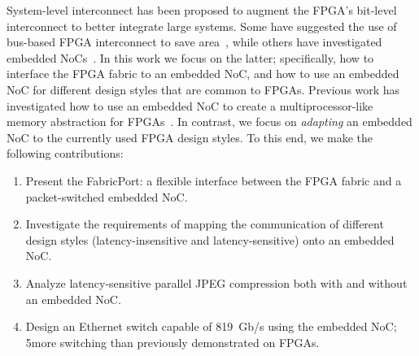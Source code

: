 %
%

System-level interconnect has been proposed to augment the FPGA's bit-level interconnect to better integrate large systems.
Some have suggested the use of bus-based FPGA interconnect to save area~\cite{Ye2006}, while others have investigated embedded NoCs~\cite{micro, Francis2008, Goossens2008}.
In this work we focus on the latter; specifically, how to interface the FPGA fabric to an embedded NoC, and how to use an embedded NoC for different design styles that are common to FPGAs.
Previous work has investigated how to use an embedded NoC to create a multiprocessor-like memory abstraction for FPGAs~\cite{Chung2011}.
In contrast, we focus on \textit{adapting} an embedded NoC to the currently used FPGA design styles.
To this end, we make the following contributions:
%
\vspace{-0.1cm}
%
\begin{enumerate}
\setlength\itemsep{-0.33mm}
\item Present the FabricPort: a flexible interface between the FPGA fabric and a packet-switched embedded NoC.
\item Investigate the requirements of mapping the communication of different design styles (latency-insensitive and latency-sensitive) onto an embedded NoC.
\item Analyze latency-sensitive parallel JPEG compression both with and without an embedded NoC.
\item Design an Ethernet switch capable of 819~Gb/s using the embedded NoC; 5\xx more switching than previously demonstrated on FPGAs.
\end{enumerate}
%


%
%
